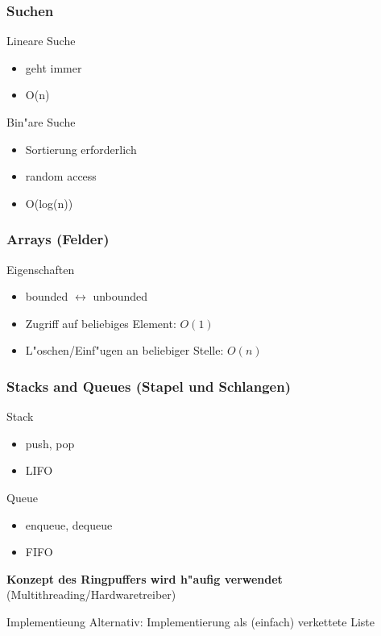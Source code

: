 \documentclass{beamer}
\begin{document}
\begin{frame}
\frametitle{Suchen}
\begin{block}{Lineare Suche}
\begin{itemize}
\item geht immer
\item O(n)
\end{itemize}
\end{block}

\pause

\begin{block}{Bin"are Suche}
\begin{itemize}
\item Sortierung erforderlich
\item random access
\item O(log(n))
\end{itemize}
\end{block}
\end{frame}


\begin{frame}
\frametitle{Arrays \tiny(Felder)}
\begin{block}{Eigenschaften}
\begin{itemize}
\item bounded $\leftrightarrow$ unbounded
\item Zugriff auf beliebiges Element: $O(1)$
\item L"oschen/Einf"ugen an beliebiger Stelle: \pause$O(n)$
\end{itemize}
\end{block}
\end{frame}


\begin{frame}
\frametitle{Stacks and Queues \tiny(Stapel und Schlangen)}
\begin{block}{Stack}
\begin{itemize}
\item push, pop
\pause
\item LIFO
\end{itemize}
\end{block}

\pause

\begin{block}{Queue}
\begin{itemize}
\item enqueue, dequeue
\pause
\item FIFO
\end{itemize}
\textbf{Konzept des Ringpuffers wird h"aufig verwendet} (Multithreading/Hardwaretreiber)
\end{block}

\pause

\begin{alertblock}{Implementieung}
Alternativ: Implementierung als (einfach) verkettete Liste
\end{alertblock}
\end{frame}
\end{document}
